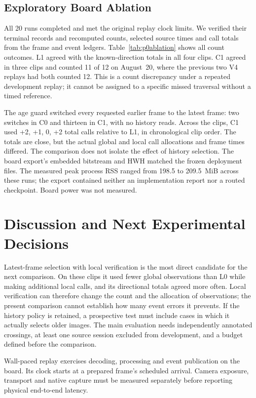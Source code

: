 \documentclass[journal]{IEEEtran}
\begin{document}
\subsection{Exploratory Board Ablation}

All 20 runs completed and met the original replay clock limits. We verified their terminal records and recomputed counts, selected source times and call totals from the frame and event ledgers. Table~\ref{tab:p0ablation} shows all count outcomes. L1 agreed with the known-direction totals in all four clips. C1 agreed in three clips and counted 11 of 12 on August~20, where the previous two V4 replays had both counted 12. This is a count discrepancy under a repeated development replay; it cannot be assigned to a specific missed traversal without a timed reference.

The age guard switched every requested earlier frame to the latest frame: two switches in C0 and thirteen in C1, with no history reads. Across the clips, C1 used +2, +1, 0, +2 total calls relative to L1, in chronological clip order. The totals are close, but the actual global and local call allocations and frame times differed. The comparison does not isolate the effect of history selection. The board export's embedded bitstream and HWH matched the frozen deployment files. The measured peak process RSS ranged from 198.5 to 209.5~MiB across these runs; the export contained neither an implementation report nor a routed checkpoint. Board power was not measured.

\section{Discussion and Next Experimental Decisions}
Latest-frame selection with local verification is the most direct candidate for the next comparison. On these clips it used fewer global observations than L0 while making additional local calls, and its directional totals agreed more often. Local verification can therefore change the count and the allocation of observations; the present comparison cannot establish how many event errors it prevents. If the history policy is retained, a prospective test must include cases in which it actually selects older images. The main evaluation needs independently annotated crossings, at least one source session excluded from development, and a budget defined before the comparison.

Wall-paced replay exercises decoding, processing and event publication on the board. Its clock starts at a prepared frame's scheduled arrival. Camera exposure, transport and native capture must be measured separately before reporting physical end-to-end latency.
\end{document}
